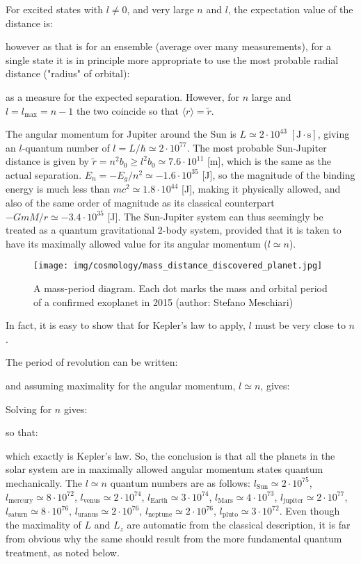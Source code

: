 	For excited states with $l \neq 0$, and very large $n$ and $l$,	the expectation value of the distance is:
	
	however as that is for an ensemble (average over many measurements), for a single state it is in principle more appropriate to use the most probable radial distance ("radius" of orbital):
	
	as a measure for the expected separation. However, for $n$ large and $l=l_{\max} = n-1$ the two coincide so that $\langle r \rangle	= \tilde{r}$.
	
	The angular momentum for Jupiter around the Sun is $L \simeq 2 \cdot 10^{43}\;[\text{J}\cdot \text{s}]$, giving an $l$-quantum number of $l = L/\hbar \simeq 2 \cdot 10^{77}$. The most probable Sun-Jupiter distance is given by $\tilde{r} = n^2 b_0 \geq l^2 b_0 \simeq 7.6 \cdot 10^{11}$ [m], which is the same as the actual separation. $E_n =-E_g/n^2 \simeq - 1.6 \cdot 10^{35}$ [J], so the magnitude of the binding energy is much less than $mc^2 \simeq 1.8 \cdot 10^{44}$ [J], making it physically allowed, and also of the same order of magnitude as its classical counterpart $-GmM/r \simeq - 3.4 \cdot 10^{35}$ [J]. The Sun-Jupiter system can thus seemingly be treated as a quantum gravitational 2-body system, provided that it is taken to have its maximally allowed value for its angular momentum ($l \simeq n$).
	 \begin{figure}[H]
		\centering
		\texttt{[image: img/cosmology/mass\_distance\_discovered\_planet.jpg]}
		\caption[Mass-period diagram of confirmed discovered exoplanets in 2015]{A mass-period diagram. Each dot marks the mass and orbital period of a confirmed exoplanet in 2015 (author: Stefano Meschiari)}
	\end{figure}
	In fact, it is easy to show that for Kepler's law to apply, $l$ must be very close to $n$.
	
	The period of revolution can be written:	
	
	and assuming maximality for the angular momentum, $l \simeq n$,
	gives:	
	
	Solving for $n$ gives:
	
	so that:
	
	which exactly is Kepler's law. So, the conclusion is that all the planets in the solar system are in maximally allowed angular momentum states quantum mechanically. The $l \simeq n$ quantum	numbers are as follows: $l_{\text{Sun}} \simeq 2 \cdot 10^{75}$, $l_{\text{mercury}} \simeq 8 \cdot 10^{72}$, $l_{\text{venus}} \simeq 2 \cdot 	10^{74}$, $l_{\text{Earth}} \simeq 3 \cdot 10^{74}$, $l_{\text{Mars}} \simeq 4 	\cdot 10^{73}$, $l_{\text{jupiter}} \simeq 2 \cdot 10^{77}$, $l_{\text{saturn}} \simeq 8 \cdot 10^{76}$, $l_{\text{uranus}} \simeq 2 \cdot 10^{76}$, $l_{\text{neptune}} \simeq 2 \cdot 10^{76}$, $l_{\text{pluto}} \simeq 3 \cdot 10^{72}$. Even though the maximality of $L$ and $L_z$ are automatic from the classical description, it is far from obvious why the same should result from the more fundamental quantum treatment, as noted below.
	
